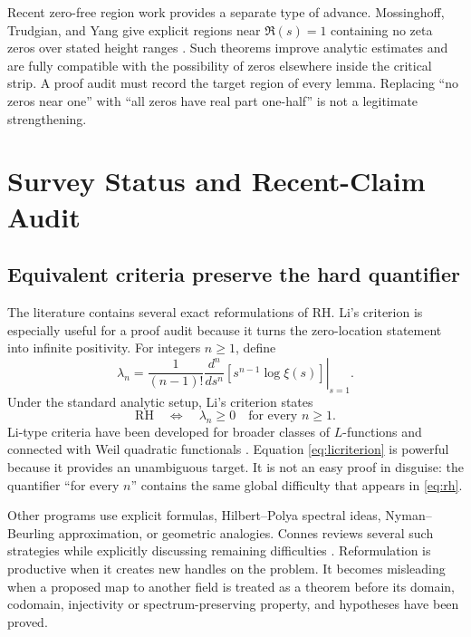 \documentclass[conference]{../../../../Conference-LaTeX-template_10-17-19/IEEEtran}
\begin{document}
Recent zero-free region work provides a separate type of advance. Mossinghoff, Trudgian, and Yang give explicit regions near $\Re(s)=1$ containing no zeta zeros over stated height ranges \cite{mty}. Such theorems improve analytic estimates and are fully compatible with the possibility of zeros elsewhere inside the critical strip. A proof audit must record the target region of every lemma. Replacing ``no zeros near one'' with ``all zeros have real part one-half'' is not a legitimate strengthening.

\section{Survey Status and Recent-Claim Audit}
\subsection{Equivalent criteria preserve the hard quantifier}
The literature contains several exact reformulations of RH. Li's criterion is especially useful for a proof audit because it turns the zero-location statement into infinite positivity. For integers $n\ge1$, define
\begin{equation}
 \lambda_n=\frac{1}{(n-1)!}\left.\frac{d^n}{ds^n}\left[s^{n-1}\log\xi(s)\right]\right|_{s=1}.
\label{eq:li}
\end{equation}
Under the standard analytic setup, Li's criterion states
\begin{equation}
 \mathrm{RH}\quad\Longleftrightarrow\quad \lambda_n\ge0\quad\text{for every }n\ge1.
\label{eq:licriterion}
\end{equation}
Li-type criteria have been developed for broader classes of $L$-functions and connected with Weil quadratic functionals \cite{lagarias,brown,bucur}. Equation \eqref{eq:licriterion} is powerful because it provides an unambiguous target. It is not an easy proof in disguise: the quantifier ``for every $n$'' contains the same global difficulty that appears in \eqref{eq:rh}.

Other programs use explicit formulas, Hilbert--Polya spectral ideas, Nyman--Beurling approximation, or geometric analogies. Connes reviews several such strategies while explicitly discussing remaining difficulties \cite{connes}. Reformulation is productive when it creates new handles on the problem. It becomes misleading when a proposed map to another field is treated as a theorem before its domain, codomain, injectivity or spectrum-preserving property, and hypotheses have been proved.
\end{document}
